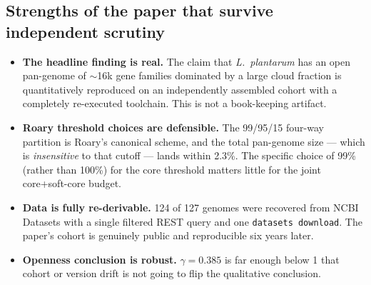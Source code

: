 \documentclass[11pt,letterpaper]{article}
\begin{document}
\subsection{Strengths of the paper that survive independent scrutiny}
\begin{itemize}
  \item \textbf{The headline finding is real.} The claim that \emph{L.\ plantarum} has an
        open pan-genome of $\sim$16k gene families dominated by a large cloud fraction
        is quantitatively reproduced on an independently assembled cohort with a
        completely re-executed toolchain. This is not a book-keeping artifact.
  \item \textbf{Roary threshold choices are defensible.} The 99/95/15 four-way partition
        is Roary's canonical scheme, and the total pan-genome size --- which is
        \emph{insensitive} to that cutoff --- lands within 2.3\%. The specific choice
        of 99\% (rather than 100\%) for the core threshold matters little for the joint
        core+soft-core budget.
  \item \textbf{Data is fully re-derivable.} 124 of 127 genomes were recovered from
        NCBI Datasets with a single filtered REST query and one \texttt{datasets download}.
        The paper's cohort is genuinely public and reproducible six years later.
  \item \textbf{Openness conclusion is robust.} $\gamma = 0.385$ is far enough below 1 that
        cohort or version drift is not going to flip the qualitative conclusion.
\end{itemize}
\end{document}
